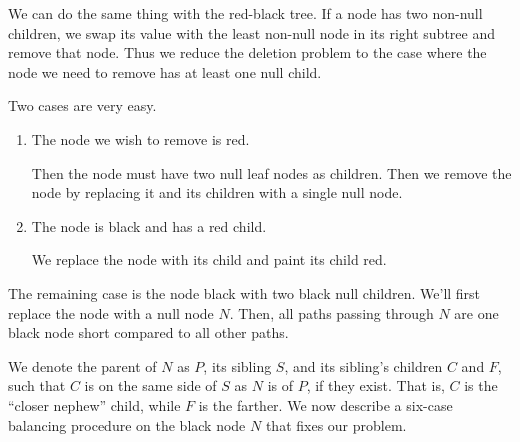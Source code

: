 We can do the same thing with the red-black tree. If a node has two non-null children, we swap its value with the least non-null node in its right subtree and remove that node. Thus we reduce the deletion problem to the case where the node we need to remove has at least one null child.

Two cases are very easy.

\begin{enumerate}

\item
The node we wish to remove is red.

Then the node must have two null leaf nodes as children. Then we remove the node by replacing it and its children with a single null node.

\item
The node is black and has a red child.

We replace the node with its child and paint its child red.

\end{enumerate}

The remaining case is the node black with two black null children. We'll first replace the node with a null node $N$. Then, all paths passing through $N$ are one black node short compared to all other paths.

We denote the parent of $N$ as $P$, its sibling $S$, and its sibling's children $C$ and $F$, such that $C$ is on the same side of $S$ as $N$ is of $P$, if they exist. That is, $C$ is the ``closer nephew'' child, while $F$ is the farther. We now describe a six-case balancing procedure on the black node $N$ that fixes our problem.

